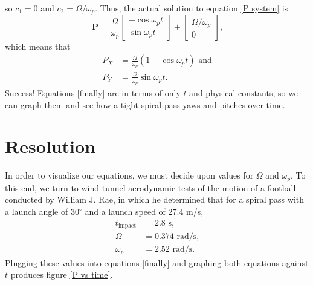 \documentclass{article}
\begin{document}
so $c_1 = 0$ and $c_2 = \Omega / \omega_p$. Thus, the actual solution to equation \ref{P system} is
\begin{equation}\label{actual nonhomo}
    \mathbf{P} = \frac{\Omega}{\omega_p}
    \begin{bmatrix}
        -\cos{\omega_p t} \\ \sin{\omega_p t}
    \end{bmatrix} +
    \begin{bmatrix}
        \Omega / \omega_p \\ 0
    \end{bmatrix}\text{,}
\end{equation}
which means that
\begin{equation}\label{finally}
    \begin{split}
        P_X &= \frac{\Omega}{\omega_p}(1 - \cos{\omega_p t})\text{ and} \\
        P_Y &= \frac{\Omega}{\omega_p}\sin{\omega_p t}\text{.}
    \end{split}
\end{equation}
Success! Equations \ref{finally} are in terms of only $t$ and physical constants, so we can graph them and see how a tight spiral pass yaws and pitches over time.

\section{Resolution}
In order to visualize our equations, we must decide upon values for $\Omega$ and $\omega_p$. To this end, we turn to wind-tunnel aerodynamic tests of the motion of a football conducted by William J. Rae, in which he determined that for a spiral pass with a launch angle of $30^{\circ}$ and a launch speed of $27.4$ m/s,
\begin{equation}\label{parameters}
    \begin{split}
        t_\text{impact} &= 2.8\text{ s,} \\
        \Omega &= 0.374\text{ rad/s,} \\
        \omega_p &= 2.52\text{ rad/s.}
    \end{split}
\end{equation}
Plugging these values into equations \ref{finally} and graphing both equations against $t$ produces figure \ref{P vs time}.
\end{document}
